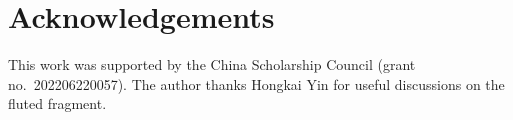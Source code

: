 \documentclass{lmcs}
\begin{document}
\section*{Acknowledgements}
This work was supported by the China Scholarship Council (grant no.~202206220057). The author thanks Hongkai Yin for useful discussions on the fluted fragment.



\end{document}
